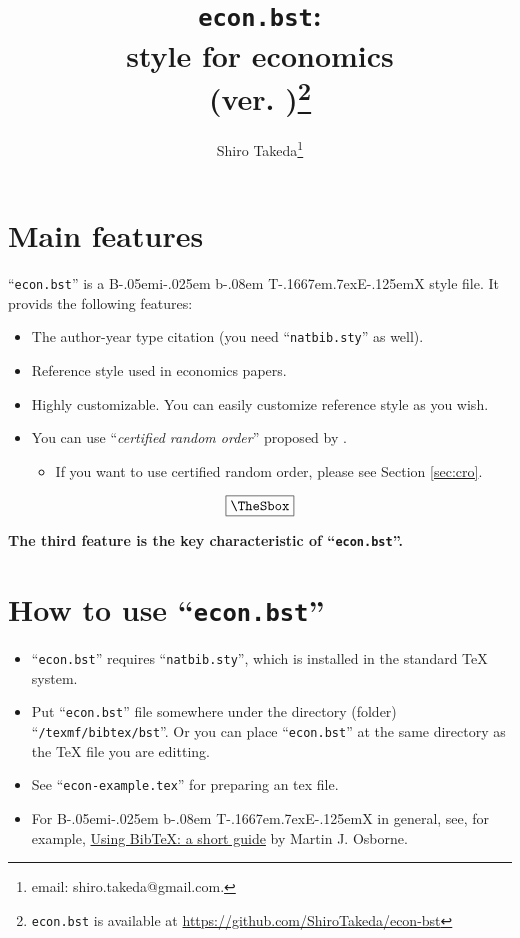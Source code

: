 \documentclass[10pt]{article}
\title{\texttt{econ.bst}:\\
\BibTeX{} style for economics\\(ver. \myversion)\thanks{\texttt{econ.bst} is available at
\url{https://github.com/ShiroTakeda/econ-bst}}
}
\author{Shiro Takeda\thanks{email: {\ttfamily shiro.takeda@gmail.com}.}}
\date{\mydate}
\newenvironment{Frame}%
{\setlength{\fboxsep}{15pt}
\setlength{\mylength}{\linewidth}%
\addtolength{\mylength}{-2\fboxsep}%
\addtolength{\mylength}{-2\fboxrule}%
\Sbox
\minipage{\mylength}%
\setlength{\abovedisplayskip}{0pt}%
\setlength{\belowdisplayskip}{0pt}%
}%
{\endminipage\endSbox
\[\fbox{\TheSbox}\]}
\def\BibTeX{{\rm B\kern-.05em{\sc i\kern-.025em b}\kern-.08em
    T\kern-.1667em\lower.7ex\hbox{E}\kern-.125emX}}
\begin{document}
\maketitle

\newlength{\mylength}
\setlength{\fboxsep}{15pt}
\setlength{\mylength}{\linewidth}
\addtolength{\mylength}{-2\fboxsep}
\addtolength{\mylength}{-2\fboxrule}

\tableofcontents


\setlength{\baselineskip}{16pt}

\section{Main features}

``\texttt{econ.bst}'' is a \BibTeX{} style file. It provids the following
features:
\begin{Frame}
 \begin{itemize}
  \item The author-year type citation (you need ``\texttt{natbib.sty}'' as well).
  \item Reference style used in economics papers.
  \item Highly customizable.  You can easily customize reference style as you
        wish.
  \item You can use ``\textit{certified random order}'' proposed by
        \href{http://dx.doi.org/10.1257/aer.20161492}{\citet[][AER]{10.1257/aer.20161492}}.
        \begin{itemize}
         \item If you want to use certified random order, please see Section
               \ref{sec:cro}.
        \end{itemize}
 \end{itemize}
\end{Frame}

\textbf{The third feature is the key characteristic of ``\texttt{econ.bst}''.}

\section{How to use ``\texttt{econ.bst}''}

\begin{itemize}
 \item ``\texttt{econ.bst}'' requires ``\texttt{natbib.sty}'', which is
       installed in the standard \TeX{} system.
 \item Put ``\texttt{econ.bst}'' file somewhere under the directory (folder)
       ``\texttt{/texmf/bibtex/bst}''. Or you can place ``\texttt{econ.bst}'' at
       the same directory as the \TeX{} file you are editting.
 \item See ``\texttt{econ-example.tex}'' for preparing an tex file.
 \item For \BibTeX{} in general, see, for example,
       \href{https://www.economics.utoronto.ca/osborne/latex/BIBTEX.HTM}{Using
       BibTeX: a short guide} by Martin J. Osborne.
\end{itemize}
\end{document}
